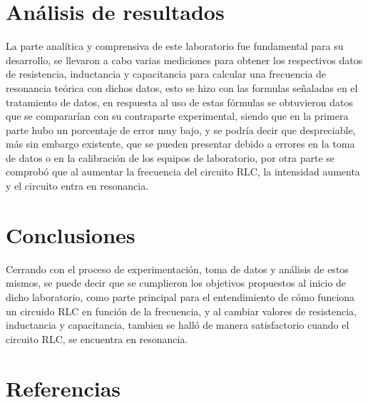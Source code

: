 \documentclass[spanish,notitlepage,letterpaper, 12pt]{article}
\begin{document}
\section{Análisis de resultados}
La parte analítica y comprensiva de este laboratorio fue fundamental para su desarrollo, se llevaron a cabo varias mediciones para obtener los respectivos datos de resistencia, inductancia y capacitancia para calcular una frecuencia de resonancia teórica con dichos datos, esto se hizo con las formulas señaladas en el tratamiento de datos, en respuesta al uso de estas fórmulas se obtuvieron datos que se compararían con su contraparte experimental, siendo que en la primera parte hubo un porcentaje de error muy bajo, y se podría decir que despreciable, más sin embargo existente, que se pueden presentar debido a errores en la toma de datos o en la calibración de los equipos de laboratorio, por otra parte se comprobó que al aumentar la frecuencia del circuito RLC, la intensidad aumenta y el circuito entra en resonancia.
\section{Conclusiones}
Cerrando con el proceso de experimentación, toma de datos y análisis de estos mismos, se puede decir que se cumplieron los objetivos propuestos al inicio de dicho laboratorio, como parte principal para el entendimiento de cómo funciona un circuido RLC en función de la frecuencia, y al cambiar valores de resistencia, inductancia y capacitancia, tambien se halló de manera satisfactorio cuando el circuito RLC, se encuentra en resonancia.
\section{Referencias} 


\end{document}
